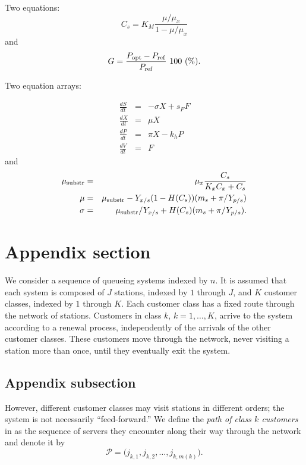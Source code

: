 \documentclass[aoas,preprint]{imsart}
\numberwithin{equation}{section}
\theoremstyle{plain}
\begin{document}
{Two equations:
\begin{equation}
    C_{s}  =  K_{M} \frac{\mu/\mu_{x}}{1-\mu/\mu_{x}} \label{ccs}
\end{equation}
and
\begin{equation}
    G = \frac{P_{\rm opt} - P_{\rm ref}}{P_{\rm ref}} \mbox{\ }100 \mbox{\ }(\%).
\end{equation}

Two equation arrays:

\begin{eqnarray}
  \frac{dS}{dt} & = & - \sigma X + s_{F} F\\
  \frac{dX}{dt} & = &   \mu    X\\
  \frac{dP}{dt} & = &   \pi    X - k_{h} P\\
  \frac{dV}{dt} & = &   F
\end{eqnarray}
and
\begin{eqnarray}
 \mu_{\rm substr} & = & \mu_{x} \frac{C_{s}}{K_{x}C_{x}+C_{s}}  \\
 \mu              & = & \mu_{\rm substr} - Y_{x/s}(1-H(C_{s}))(m_{s}+\pi /Y_{p/s}) \\
 \sigma           & = & \mu_{\rm substr}/Y_{x/s}+ H(C_{s}) (m_{s}+ \pi /Y_{p/s}).
\end{eqnarray}


\appendix

\section{Appendix section}\label{app}

We consider a sequence of queueing systems
indexed by $n$.  It is assumed that each system
is composed of $J$ stations, indexed by $1$
through $J$, and $K$ customer classes, indexed
by $1$ through $K$.  Each customer class
has a fixed route through the network of
stations.  Customers in class
$k$, $k=1,\ldots,K$, arrive to the
system according to a
renewal process, independently of the arrivals
of the other customer classes.  These customers
move through the network, never visiting a station
more than once, until they eventually exit
the system.

\subsection{Appendix subsection}

However, different customer classes may visit
stations in different orders; the system
is not necessarily ``feed-forward.''
We define the {\em path of class $k$ customers} in
as the sequence of servers
they encounter along their way through the network
and denote it by
\begin{equation}
\mathcal{P}=\bigl(j_{k,1},j_{k,2},\dots,j_{k,m(k)}\bigr). \label{path}
\end{equation}

}
\end{document}
